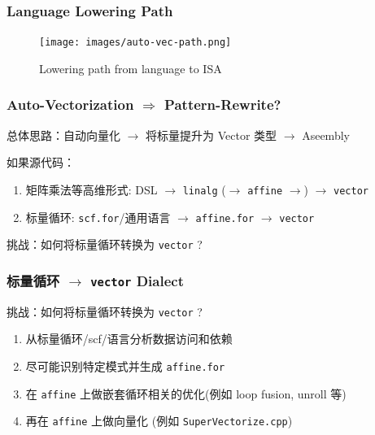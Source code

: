 \documentclass[aspectratio=169]{ctexbeamer}
\begin{document}
\begin{frame}
    \frametitle{Language Lowering Path}
    \begin{figure}
        \centering
        \texttt{[image: images/auto-vec-path.png]}
        \caption{Lowering path from language to ISA}
    \end{figure}
\end{frame}

\begin{frame}
    \frametitle{Auto-Vectorization $\Rightarrow$ Pattern-Rewrite?}

    总体思路：自动向量化 $\rightarrow$ 将标量提升为 Vector 类型 $\rightarrow$ Aseembly

    \hspace{2em}

    如果源代码：
    \begin{enumerate}
        \item 矩阵乘法等高维形式: DSL $\rightarrow$ \texttt{linalg} ($\rightarrow$ \texttt{affine} $\rightarrow$) $\rightarrow$ \texttt{vector}
        \item 标量循环: \texttt{scf.for}/通用语言 $\rightarrow$ \texttt{affine.for} $\rightarrow$ \texttt{vector}
    \end{enumerate}

    \begin{center}
        \vspace{2em}
        挑战：如何将标量循环转换为 \texttt{vector} ?
    \end{center}

\end{frame}

\begin{frame}
    \frametitle{标量循环 $\rightarrow$ \texttt{vector} Dialect}

    \begin{center}
        挑战：如何将标量循环转换为 \texttt{vector} ?

        \vspace{1.5em}
    \end{center}

    \begin{enumerate}
        \item 从标量循环/scf/语言分析数据访问和依赖
        \item 尽可能识别特定模式并生成 \texttt{affine.for}
        \item 在 \texttt{affine} 上做嵌套循环相关的优化(例如 loop fusion, unroll 等)
        \item 再在 \texttt{affine} 上做向量化 (例如 \texttt{SuperVectorize.cpp})
    \end{enumerate}
\end{frame}
\end{document}

